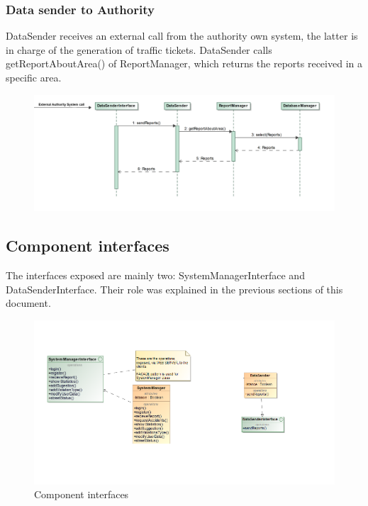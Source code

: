 \subsubsection{Data sender to Authority}
DataSender receives an external call from the authority own system, the latter is in charge of the generation of traffic tickets. DataSender calls getReportAboutArea() of ReportManager, which returns the reports received in a specific area. 
\begin{figure}[H]
	\centering
	\includegraphics[width=0.9\linewidth]{Images/RunTimeDiagram/DataSender}
	\caption[Data Sender to Authority]{}
	\label{fig:datasender}
\end{figure}


\subsection{Component interfaces}

The interfaces exposed are mainly two: SystemManagerInterface and DataSenderInterface. Their role was explained in the previous sections of this document.

\begin{figure}[H]
	\centering
	\includegraphics[width=1.12\linewidth]{Images/ComponentInterfaces.png}
	\caption{Component interfaces}
\end{figure}


